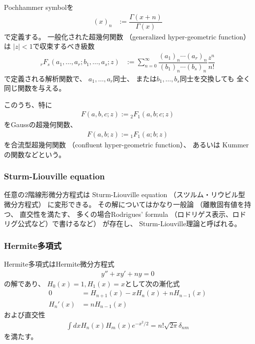 Pochhammer symbolを
\begin{align}
    (x)_n
    &:=
    \dfrac{\Gamma(x+n)}{\Gamma(x)}
\end{align}
で定義する。
一般化された超幾何関数
（generalized hyper-geometric function）は
$|z| < 1$で収束するべき級数
\begin{align}
    {}_r F_s
    (
        a_1, \dots, a_r;
        b_1, \dots, a_s;
        z
    )
    &:=
    \sum_{n=0}^{\infty}
    \dfrac{ (a_1)_n \cdots (a_r)_n }{
      (b_1)_n \cdots (b_s)_n
    }
    \dfrac{z^n}{n!}  
\end{align}
で定義される解析関数で、
$a_1, \dots, a_r$同士、
または$b_1, \dots, b_s$同士を交換しても
全く同じ関数を与える。

このうち、特に
\begin{align}
    F(a, b, c; z)
    :=
    {}_2 F_1 (a, b; c; z)
\end{align}
をGaussの超幾何関数、
\begin{align}
    F(a, b; z)
    :=
    {}_1 F_1(a; b; z)
\end{align}
を合流型超幾何関数
（confluent hyper-geometric function）、
あるいは
Kummerの関数などという。

\subsubsection{Sturm-Liouville equation}

任意の$2$階線形微分方程式は
Sturm-Liouville equation
（スツルム・リウビル型微分方程式）
に変形できる。
その解についてはかなり一般論
（離散固有値を持つ、
直交性を満たす、
多くの場合Rodrigues' formula
（ロドリゲス表示、ロドリグ公式など）で書けるなど）
が存在し、
Sturm-Liouville理論と呼ばれる。

\subsubsection{Hermite多項式}
\label{hermite polynomial}

Hermite多項式はHermite微分方程式
\begin{align}
    y'' + x y' + n y = 0
\end{align}
の解であり、
$H_0(x) = 1, H_1(x) = x$として次の漸化式
\begin{subequations}
\begin{align}
    0
    &=
    H_{n+1}(x)
    -
    x H_n(x)
    +
    n H_{n-1}(x)
\\
    H_n'(x)
    &=
    n H_{n-1}(x)
\end{align}
\label{hermite polynomial recurrence relation}
\end{subequations}
および直交性
\begin{align}
    \int dx H_n(x) H_m(x) e^{-x^2/2}
    =
    n! \sqrt{2 \pi}
    \delta_{nm}
\label{normality of hermite polynomial}
\end{align}
を満たす。

